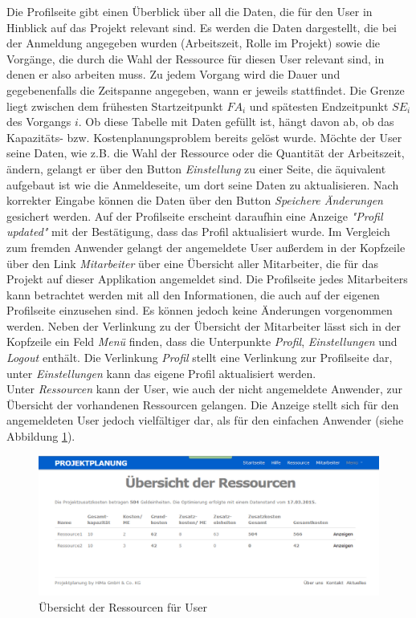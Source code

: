 \documentclass[a4paper,12pt,parskip,bibtotoc,liststotoc]{article}
\begin{document}
Die Profilseite gibt einen Überblick über all die Daten, die für den User in Hinblick auf das Projekt relevant sind. Es werden die Daten dargestellt, die bei der Anmeldung angegeben wurden (Arbeitszeit, Rolle im Projekt) sowie die Vorgänge, die durch die Wahl der Ressource für diesen User relevant sind, in denen er also arbeiten muss. Zu jedem Vorgang wird die Dauer und gegebenenfalls die Zeitspanne angegeben, wann er jeweils stattfindet. Die Grenze liegt zwischen dem frühesten Startzeitpunkt $FA_{i}$ und spätesten Endzeitpunkt $SE_{i}$ des Vorgangs $i$. Ob diese Tabelle mit Daten gefüllt ist, hängt davon ab, ob das Kapazitäts- bzw. Kostenplanungsproblem bereits gelöst wurde. Möchte der User seine Daten, wie z.B. die Wahl der Ressource oder die Quantität der Arbeitszeit, ändern, gelangt er über den Button \textit{Einstellung} zu einer Seite, die äquivalent aufgebaut ist wie die Anmeldeseite, um dort seine Daten zu aktualisieren. Nach korrekter Eingabe können die Daten über den Button \textit{Speichere Änderungen} gesichert werden. Auf der Profilseite erscheint daraufhin eine Anzeige \textit{"Profil updated"} mit der Bestätigung, dass das Profil aktualisiert wurde. Im Vergleich zum fremden Anwender gelangt der angemeldete User außerdem in der Kopfzeile über den Link \textit{Mitarbeiter} über eine Übersicht aller Mitarbeiter, die für das Projekt auf dieser Applikation angemeldet sind. Die Profilseite jedes Mitarbeiters kann betrachtet werden mit all den Informationen, die auch auf der eigenen Profilseite einzusehen sind. Es können jedoch keine Änderungen vorgenommen werden. Neben der Verlinkung zu der Übersicht der Mitarbeiter lässt sich in der Kopfzeile ein Feld \textit{Menü} finden, dass die Unterpunkte \textit{Profil}, \textit{Einstellungen} und \textit{Logout} enthält. Die Verlinkung \textit{Profil} stellt eine Verlinkung zur Profilseite dar, unter \textit{Einstellungen} kann das eigene Profil aktualisiert werden.\\
Unter \textit{Ressourcen} kann der User, wie auch der nicht angemeldete Anwender, zur Übersicht der vorhandenen Ressourcen gelangen. Die Anzeige stellt sich für den angemeldeten User jedoch vielfältiger dar, als für den einfachen Anwender (siehe Abbildung \ref{ResUs}).\\

\begin{figure}[h!]
  \begin{center}
    \includegraphics[width=120mm]{Bilder/Ressourcen_User.png}
    \caption{Übersicht der Ressourcen für User}  \label{ResUs}
  \end{center}
\end{figure}
\end{document}
